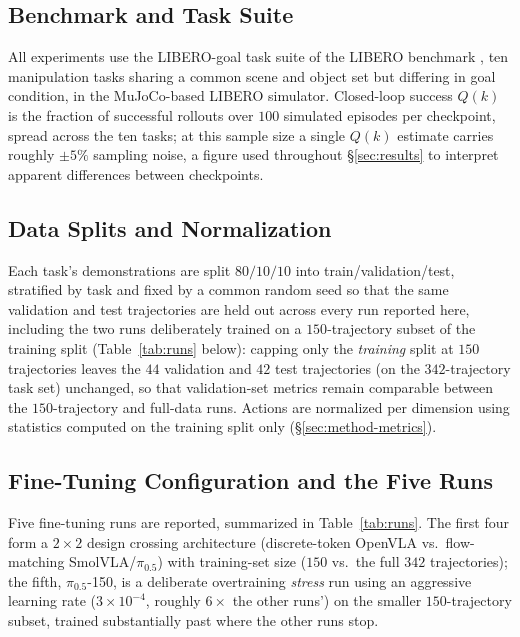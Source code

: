 \documentclass[11pt]{article}
\numberwithin{equation}{section}
\numberwithin{table}{section}
\numberwithin{figure}{section}
\begin{document}
\subsection{Benchmark and Task Suite}
\label{sec:implementation-benchmark}

All experiments use the LIBERO-goal task suite of the LIBERO benchmark \cite{liu2023libero}, ten
manipulation tasks sharing a common scene and object set but differing in goal condition, in the
MuJoCo-based LIBERO simulator. Closed-loop success $Q(k)$ is the fraction of successful rollouts over
$100$ simulated episodes per checkpoint, spread across the ten tasks; at this sample size a single $Q(k)$
estimate carries roughly $\pm5\%$ sampling noise, a figure used throughout \S\ref{sec:results} to
interpret apparent differences between checkpoints.

\subsection{Data Splits and Normalization}
\label{sec:implementation-data}

Each task's demonstrations are split $80/10/10$ into train/validation/test, stratified by task and fixed
by a common random seed so that the same validation and test trajectories are held out across every
run reported here, including the two runs deliberately trained on a $150$-trajectory subset of the
training split (Table~\ref{tab:runs} below): capping only the \emph{training} split at $150$
trajectories leaves the $44$ validation and $42$ test trajectories (on the $342$-trajectory task set)
unchanged, so that validation-set metrics remain comparable between the $150$-trajectory and full-data
runs. Actions are normalized per dimension using statistics computed on the training split only
(\S\ref{sec:method-metrics}).

\subsection{Fine-Tuning Configuration and the Five Runs}
\label{sec:implementation-runs}

Five fine-tuning runs are reported, summarized in Table~\ref{tab:runs}. The first four form a
$2\times2$ design crossing architecture (discrete-token OpenVLA vs.\ flow-matching SmolVLA/$\pi_{0.5}$)
with training-set size ($150$ vs.\ the full $342$ trajectories); the fifth, $\pi_{0.5}$-150, is a
deliberate overtraining \emph{stress} run using an aggressive learning rate
($3\times10^{-4}$, roughly $6\times$ the other runs') on the smaller $150$-trajectory subset, trained
substantially past where the other runs stop.
\end{document}
